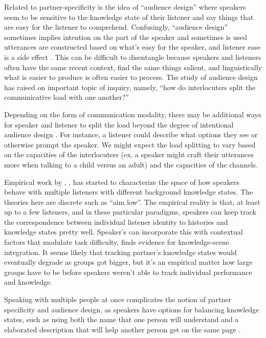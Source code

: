 \documentclass[]{article}
\begin{document}
Related to partner-specificity is the idea of ``audience design'' where speakers seem to be sensitive to the knowledge state of their listener and say things that are easy for the listener to comprehend. Confusingly, ``audience design'' sometimes implies intention on the part of the speaker and sometimes is used utterances are constructed based on what's easy for the speaker, and listener ease is a side effect \cite{horton1996, rogers2013, macdonald2013, horton2002a, horton2005}. This can be difficult to disentangle because speakers and listeners often have the same recent context, find the same things salient, and linguistically what is easier to produce is often easier to process. The study of audience design has raised on important topic of inquiry, namely, ``how do interlocuters split the communicative load with one another?''

Depending on the form of communication modality, there may be additional ways for speaker and listener to split the load beyond the degree of intentional audience design \cite{clark1996, fay2010}. For instance, a listener could describe what options they see or otherwise prompt the speaker. We might expect the load splitting to vary based on the capacities of the interlocuters (ex. a speaker might craft their utterances more when talking to a child versus an adult) and the capacities of the channels. 

Empirical work by \cite{yoon2018}, \cite{yoon2019}, \cite{yoon2019a} has started to characterize the space of how speakers behave with multiple listeners with different background knowledge states. The theories here are discrete such as ``aim low''. The empirical reality is that, at least up to a few listeners, and in these particular paradigms, speakers can keep track the correspondence between individual listener identity to histories and knowledge states pretty well. Speaker's can incorporate this with contextual factors that modulate task difficulty, \cite{yoon2019a} finds evidence for knowledge-scene integration.  It seems likely that tracking partner's knowledge states would eventually degrade as groups got bigger, but it's an empirical matter how large groups have to be before speakers weren't able to track individual performance and knowledge.

 Speaking with multiple people at once complicates the notion of partner specificity and audience design, as speakers have options for balancing knowledge states, such as using both the name that one person will understand and a elaborated description that will help another person get on the same page \cite{yoon2018}.
\end{document}
